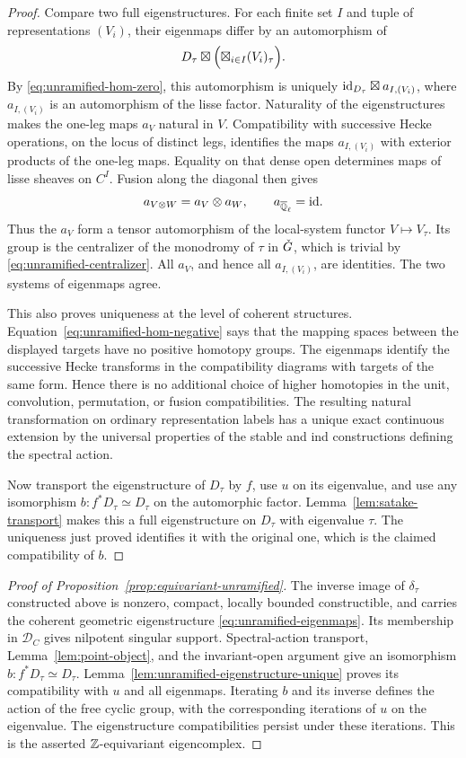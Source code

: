 \begin{proof}
Compare two full eigenstructures.  For each finite set $I$ and tuple of
representations $(V_i)$, their eigenmaps differ by an automorphism of
\[
       D_\tau\boxtimes\Bigl(\boxtimes_{i\in I}(V_i)_\tau\Bigr).
\]
By \eqref{eq:unramified-hom-zero}, this automorphism is uniquely
$\mathrm{id}_{D_\tau}\boxtimes a_{I,(V_i)}$, where $a_{I,(V_i)}$ is an
automorphism of the lisse factor.  Naturality of the eigenstructures
makes the one-leg maps $a_V$ natural in $V$.  Compatibility with
successive Hecke operations, on the locus of distinct legs, identifies
the maps $a_{I,(V_i)}$ with exterior products of the one-leg maps.
Equality on that dense open determines maps of lisse sheaves on $C^I$.
Fusion along the diagonal then gives
\[
          a_{V\otimes W}=a_V\otimes a_W,
          \qquad a_{\overline{\mathbb Q}_{\ell}}=\mathrm{id}.
\]
Thus the $a_V$ form a tensor automorphism of the local-system functor
$V\mapsto V_\tau$.  Its group is the centralizer of the monodromy of
$\tau$ in $\check G$, which is trivial by
\eqref{eq:unramified-centralizer}.  All $a_V$, and hence all
$a_{I,(V_i)}$, are identities.  The two systems of eigenmaps agree.

This also proves uniqueness at the level of coherent structures.
Equation~\eqref{eq:unramified-hom-negative} says that the mapping spaces
between the displayed targets have no positive homotopy groups.
The eigenmaps identify the successive Hecke transforms in the
compatibility diagrams with targets of the same form.  Hence there is
no additional choice of higher homotopies in the unit, convolution,
permutation, or fusion compatibilities.  The resulting natural
transformation on ordinary representation labels
has a unique exact continuous extension by the universal properties of
the stable and ind constructions defining the spectral action.

Now transport the eigenstructure of $D_\tau$ by $f$, use $u$ on its
eigenvalue, and use any isomorphism $b:f^*D_\tau\simeq D_\tau$ on the
automorphic factor.  Lemma~\ref{lem:satake-transport} makes this a full
eigenstructure on $D_\tau$ with eigenvalue $\tau$.  The uniqueness just
proved identifies it with the original one, which is the claimed
compatibility of $b$.
\end{proof}

\begin{proof}[Proof of Proposition~\ref{prop:equivariant-unramified}]
The inverse image of $\delta_\tau$ constructed above is nonzero, compact,
locally bounded constructible, and carries the coherent geometric
eigenstructure \eqref{eq:unramified-eigenmaps}.  Its membership in
$\mathcal D_C$ gives nilpotent singular support.  Spectral-action transport,
Lemma~\ref{lem:point-object}, and the invariant-open argument give an
isomorphism $b:f^*D_\tau\simeq D_\tau$.
Lemma~\ref{lem:unramified-eigenstructure-unique} proves its compatibility
with $u$ and all eigenmaps.  Iterating $b$ and its inverse defines the
action of the free cyclic group, with the corresponding iterations of
$u$ on the eigenvalue.  The eigenstructure compatibilities persist under
these iterations.  This is the asserted $\mathbb Z$-equivariant eigencomplex.
\end{proof}
